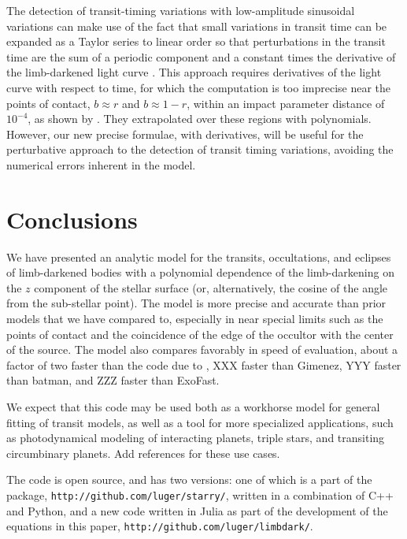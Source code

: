 \documentclass[modern]{aastex61}
\begin{document}
The detection of transit-timing variations with low-amplitude sinusoidal
variations can make use of the fact that small variations in transit time
can be expanded as a Taylor series to linear order so that perturbations
in the transit time are the sum of a periodic component and a constant
times the derivative of the limb-darkened light curve \citep{Ofir2018}.
This approach requires derivatives of the light curve with respect to
time, for which the \citet{MandelAgol2002} computation is too
imprecise near the points of contact, $b \approx r$ and $b \approx 1-r$, 
within an impact parameter distance of $10^{-4}$, as shown by \citet{Ofir2018}.
They extrapolated over these regions with polynomials.
However, our new precise formulae, with derivatives, will be useful
for the perturbative approach to the detection of transit timing
variations, avoiding the numerical errors inherent in the \citet{MandelAgol2002}
model.

\section{Conclusions}

We have presented an analytic model for the transits, occultations, and
eclipses of limb-darkened bodies with a polynomial dependence of the limb-darkening
on the $z$ component of the stellar surface (or, alternatively, the
cosine of the angle from the sub-stellar point).  The model is more precise
and accurate than prior models that we have compared to, especially in near 
special limits such as the points of contact and the coincidence of the edge 
of the occultor with the center of the source.  The model also compares favorably in
speed of evaluation, about a factor of two faster than the code due
to \citet{Pal2008}, XXX faster than Gimenez, YYY faster than batman,
and ZZZ faster than ExoFast.

We expect that this code may be used both as a workhorse model for
general fitting of transit models, as well as a tool for more 
specialized applications, such as photodynamical modeling of
interacting planets, triple stars, and transiting circumbinary planets.
{\color{red} Add references for these use cases.}

The code is open source, and has two versions:  one of which is a part
of the \starry package, \texttt{http://github.com/luger/starry/}, written
in a combination of C++ and Python, and a new code written in Julia as
part of the development of the equations in this paper,
\texttt{http://github.com/luger/limbdark/}.
\end{document}
